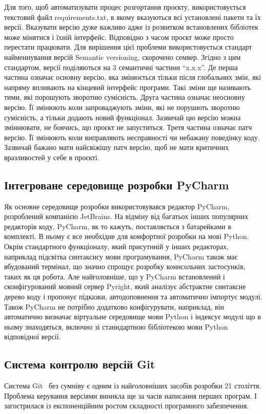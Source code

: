 Для того, щоб автоматизувати процес розгортання проєкту, використовується
текстовий файл requirements.txt, в якому вказуються всі установлені пакети
та їх версії. Вказувати версію дуже важливо адже із розвитком встановлених
бібліотек може мінятися і їхній інтерфейс. Відповідно з часом проєкт може
просто перестати працювати. Для вирішення цієї проблеми використовується
стандарт найменнування версій Semantic versioning, скорочено семвер.
Згідно з цим стандартом, версії поділяються на 3 семантичні
частини ``x.x.x''. Де перша частина означає основну версію, яка змінюється
тільки після глобальних змін, які напряму впливають на кінцевий інтерфейс
програми. Такі зміни ще називають тими, які порошують зворотню сумісність.
Друга частина означає неосновну версію. Її змінюють коли запроваджують
зміни, які не порушють зворотню сумісність, а тільки додають новий функціонал.
Зазвичай цю версію можна зміннювати, не боячись, що проєкт не запуститься.
Третя частина означає патч версію. Її змінюють коли виправляють несправності
чи небажану поведінку коду. Зазвичай бажано мати найсвіжішу патч версію,
щоб не мати критичних вразливостей у себе в проєкті.

\subsection{Інтегроване середовище розробки PyCharm}
Як основне середовище розробки використовувався редактор PyCharm, 
розроблений компанією JetBrains. На відміну від багатьох інших
популярних редакторів коду, PyCharm, як то кажуть, поставляється з батарейками
в комплекті. В ньому є все необхідне для комфортної розробки на мові
Python. Окрім стандартного функціоналу, який присутнній у інших
редакторах, наприклад підсвітка синтаксису мови програмування,
PyCharm також має вбудований термінал, що значно спрощує розробку
коннсольних застосунків, таких як ця робота. Але найголовніше,
що у PyCharm встановлений і сконфігурований мовний сервер Pyright,
який аналізує абстрактне синтаксне дерево коду і пропонує підказки,
автодоповнення та автоматично імпортує модулі. Також PyCharm не потрібно
додатково конфігурувати, наприклад, він автоматично визначає віртуальне
середовище мови Python і індексує модулі що в ньому знаходяться,
включно зі станндартною бібліотекою мови Python відповідної версії.

\subsection{Система контролю версій Git}
Система Git~\cite{bib13} без сумніву є одним із найголовніших засобів розробки 21
століття. Проблема
керування версіями виникла ще за часів написання перших програм. І загострилася із
експоненційним ростом складності програмного забезпечення.

